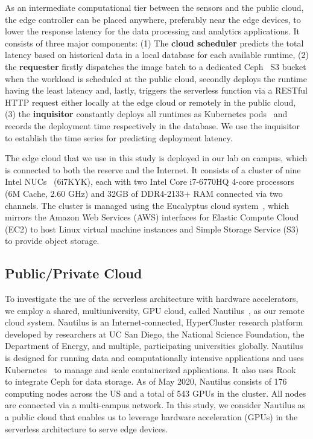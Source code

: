 As an intermediate computational tier between the sensors and the public cloud, the edge controller can be placed anywhere, preferably near the edge devices, to lower the response latency for the data processing and analytics applications. It consists of three major components: (1) The \textbf{cloud scheduler} predicts the total latency based on historical data in a local database for each available runtime, (2) the \textbf{requester} firstly dispatches the image batch to a dedicated Ceph~\cite{ref:ceph} S3 bucket when the workload is scheduled at the public cloud, secondly deploys the runtime having the least latency and, lastly, triggers the  serverless function via a RESTful HTTP request either locally at the edge cloud or remotely in the public cloud, (3) the \textbf{inquisitor} constantly deploys all runtimes as Kubernetes pods~\cite{ref:pods} and records the deployment time respectively in the database. We use the inquisitor to establish the time series for predicting deployment latency.

The edge cloud that we use in this study is deployed 
in our lab on campus, which is connected to both the reserve and the Internet. It consists of a cluster of nine Intel NUCs~\cite{ref:nucs} (6i7KYK), each with two Intel Core i7-6770HQ 4-core processors (6M Cache, 2.60 GHz) and 32GB of DDR4-2133+ RAM connected via two channels. The cluster is managed using the Eucalyptus cloud system~\cite{ref:euca}, which mirrors the Amazon Web Services (AWS) interfaces for Elastic Compute Cloud (EC2) to host Linux virtual machine instances and Simple Storage Service (S3) to provide object storage.
 
 \subsection{Public/Private Cloud}

To investigate the use of the serverless architecture with hardware accelerators, we employ a shared, multiuniversity, GPU cloud, called  Nautilus~\cite{ref:nautilus}, as our remote cloud system. Nautilus is an Internet-connected, HyperCluster research platform developed by researchers at UC San Diego, the National Science Foundation, the Department of Energy, and multiple, participating universities globally.  Nautilus is designed for running data and computationally intensive applications and uses Kubernetes~\cite{ref:k8s} to manage and scale containerized applications. It also uses Rook~\cite{ref:rook} to integrate Ceph for data storage. As of May 2020, Nautilus consists of 176 computing nodes across the US and a total of 543 GPUs in the cluster. All nodes are connected via a multi-campus network. In this study, we consider Nautilus as a public cloud that enables us to leverage hardware acceleration (GPUs) in the serverless architecture to serve edge devices. 

